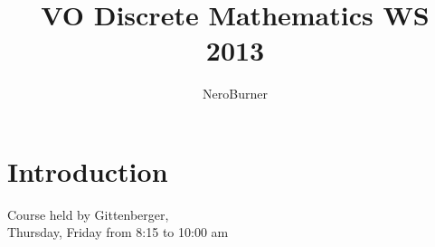 \documentclass{article}
\title{VO Discrete Mathematics
WS 2013}
\author{NeroBurner}
\begin{document}
\maketitle


\section*{Introduction}
Course held by Gittenberger, \\
Thursday, Friday from 8:15 to 10:00 am


\end{document}
